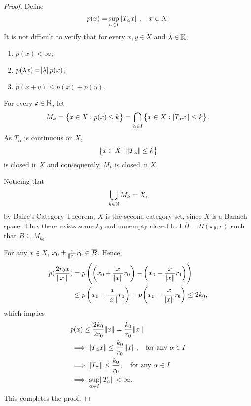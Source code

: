 \begin{proof}
Define 
\begin{equation*}
    p(x) = \sup_{\alpha \in I} \norm{T_\alpha x}, \quad x \in X. 
\end{equation*}
It is not difficult to verify that for every $x, y \in X$ and $\lambda \in 
\mathbb{K}$, 
\begin{enumerate}
    \item $p(x) < \infty$; 
    \item $p(\lambda x) = \abs{\lambda} p(x)$; 
    \item $p(x + y) \le p(x) + p(y)$. 
\end{enumerate}
For every $k \in \mathbb{N}$, let 
\begin{equation*}
    \begin{aligned}
        M_k = \left\{ x \in X: p(x) \le k \right\} 
        = \bigcap_{\alpha \in I} 
            \left\{ x \in X: \norm{T_\alpha x} \le k \right\}. 
    \end{aligned}
\end{equation*}
As $T_\alpha$ is continuous on $X$, 
\begin{equation*}
    \left\{ x \in X: \norm{T_\alpha} \le k \right\}
\end{equation*}
is closed in $X$ and consequently, $M_k$ is closed in $X$. 

Noticing that 
\begin{equation*}
    \bigcup_{k \in \mathbb{N}} M_k = X, 
\end{equation*}
by Baire's Category Theorem, $X$ is the second category set, since $X$ is a 
Banach space. 
Thus there exists some $k_0$ and nonempty closed ball $\overline{B} = 
\overline{B(x_0, r)}$ such that $\overline{B} \subseteq M_{k_0}$. 

For any $x \in X$, $x_0 \pm \frac{x}{\norm{x}} r_0 \in \overline{B}$. 
Hence, 
\begin{equation*}
    \begin{aligned}
        p(\frac{2r_0 x}{\norm{x}}) &= p\left( 
            \left( x_0 + \frac{x}{\norm{x}} r_0 \right) 
            - \left( x_0 - \frac{x}{\norm{x}} r_0 \right) \right) \\
        &\le p \left( x_0 + \frac{x}{\norm{x}} r_0 \right) 
            + p \left( x_0 - \frac{x}{\norm{x}} r_0 \right) 
        \le 2k_0, 
    \end{aligned}
\end{equation*}
which implies 
\begin{equation*}
    \begin{aligned}
        & p(x) \le \frac{2k_0}{2r_0} \norm{x} = \frac{k_0}{r_0} \norm{x} \\
        & \implies
        \norm{T_\alpha x} \le \frac{k_0}{r_0} \norm{x}, \quad 
            \text{for any } \alpha \in I \\
        & \implies
        \norm{T_\alpha} \le \frac{k_0}{r_0}, \quad 
            \text{for any } \alpha \in I \\
        & \implies \sup_{\alpha \in I} \norm{T_\alpha} < \infty. 
    \end{aligned}
\end{equation*}
This completes the proof. 
\end{proof}

